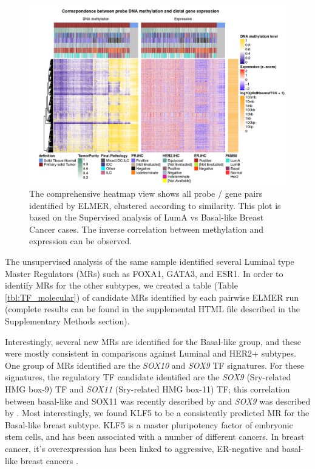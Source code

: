 \begin{figure}[ht!]
\centering
\includegraphics[width=1.0\textwidth]{images/heatmap.jpg}
\caption{\label{fig:heatmap} The comprehensive heatmap view shows all probe / gene pairs identified by ELMER, clustered according to similarity. This plot is based on the Supervised analysis of LumA vs Basal-like Breast Cancer cases. The inverse correlation between methylation and expression can be observed.}
\end{figure}

The unsupervised analysis of the same sample identified several Luminal type Master Regulators (MRs) such as FOXA1, GATA3, and ESR1. In order to identify MRs for the other subtypes, we created a table  (Table \ref{tbl:TF_molecular}) of candidate MRs identified by each pairwise ELMER run (complete results can be found in the supplemental HTML file described in the Supplementary Methods section). 

Interestingly, several new MRs are identified for the Basal-like group, and these were mostly consistent in comparisons against Luminal and HER2+ subtypes. One group of MRs identified are the \textit{SOX10} and \textit{SOX9} TF signatures. For these signatures, the regulatory TF candidate identified are the \textit{SOX9} (Sry-related HMG box-9) TF and \textit{SOX11} (Sry-related HMG box-11) TF; this correlation between basal-like and SOX11 was recently described by \cite{shepherd2016sox11} and \textit{SOX9} was described by \cite{gong2015foxa1}. Most interestingly, we found KLF5 to be a consistently predicted MR for the Basal-like breast subtype. KLF5 is a master pluripotency factor of embryonic stem cells, and has been associated with a number of different cancers. In breast cancer, it's overexpression has been linked to aggressive, ER-negative and basal-like breast cancers \cite{ben2008embryonic}. %

